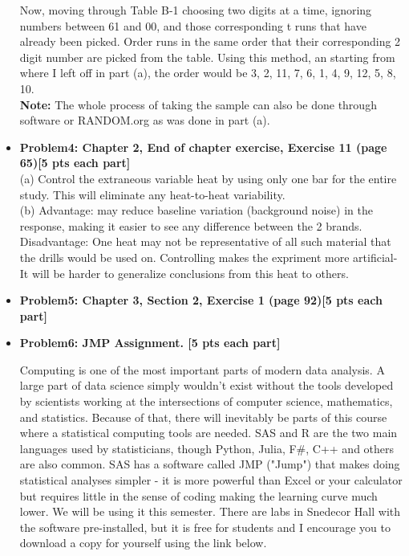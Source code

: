 \documentclass[11pt]{article}\usepackage[]{graphicx}\usepackage[]{color}
\begin{document}
\begin{itemize}
\begin{center}
\begin{tabular}{|c|c|}
	\end{tabular}
\end{center}
Now, moving through Table B-1 choosing two digits at a time, ignoring numbers between 61 and 00, and those corresponding t runs that have already been picked. Order runs in the same order that their corresponding 2 digit number are picked from the table. Using this method, an starting from where I left off in part (a), the order would be 3, 2, 11, 7, 6, 1, 4, 9, 12, 5, 8, 10.\\
\textbf{Note:} The whole process of taking the sample can also be done through software or RANDOM.org as was done in part (a).
\item \textbf{Problem4: Chapter 2, End of chapter exercise, Exercise 11 (page 65)[5 pts each part]}\\
(a) Control the extraneous variable heat by using only one bar for the entire study. This will eliminate any heat-to-heat variability.\\
(b) Advantage: may reduce baseline variation (background noise) in the response, making it easier to see any difference between the 2 brands. \\
Disadvantage: One heat may not be representative of all such material that the drills would be used on. 
Controlling makes the expriment more artificial- It will be harder to generalize conclusions from this heat to others.
\item \textbf{Problem5: Chapter 3, Section 2,  Exercise 1 (page 92)[5 pts each part]}\\

\item \textbf{Problem6: JMP Assignment. [5 pts each part]} 

   Computing is one of the most important parts of modern data analysis. A large part of data science simply wouldn't exist without the tools developed by scientists working at the intersections of computer science, mathematics, and statistics. 
   Because of that, there will inevitably be parts of this course where a statistical computing tools are needed. SAS and R are the two main languages used by statisticians, though Python, Julia, F\#, C++ and others are also common.
   SAS has a software called JMP ("Jump") that makes doing statistical analyses simpler - it is more powerful than Excel or your calculator but requires little in the sense of coding making the learning curve much lower. 
   We will be using it this semester. There are labs in Snedecor Hall with the software pre-installed, but it is free for students and I encourage you to download a copy for yourself using the link below.


\end{itemize}
\end{document}
